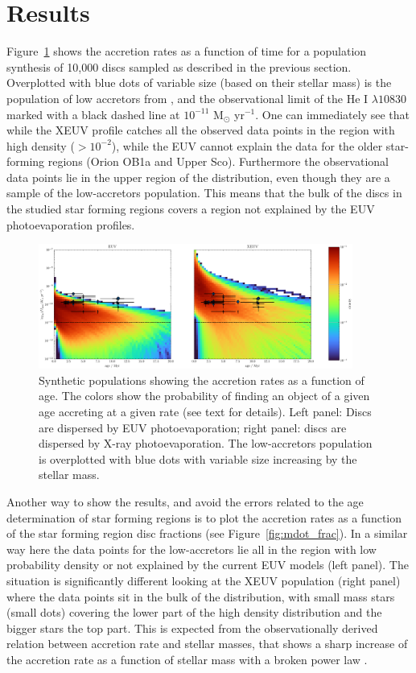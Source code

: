 \documentclass[fleqn,usenatbib,letters]{mnras}
\begin{document}
\section{Results}\label{sec:results}

Figure~\ref{fig:mdot_age} shows the accretion rates as a function of time for a population synthesis of 10,000 discs sampled as described in the previous section.
Overplotted with blue dots of variable size (based on their stellar mass) is the population of low accretors from \citet{Thanathibodee2023}, and the observational limit of the He I $\lambda10830$ marked with a black dashed line at $10^{-11}$ M$_\odot$ yr$^{-1}$.
One can immediately see that while the XEUV profile catches all the observed data points in the region with high density ($> 10^{-2}$), while the EUV cannot explain the data for the older star-forming regions (Orion OB1a and Upper Sco). Furthermore the observational data points lie in the upper region of the distribution, even though they are a sample of the low-accretors population. This means that the bulk of the discs in the studied star forming regions covers a region not explained by the EUV photoevaporation profiles.
\begin{figure}
    \includegraphics[width=0.92\textwidth]{mdot_age_comparison}
    \caption{Synthetic populations showing the accretion rates as a function of age. The colors show the probability of finding an object of a given age accreting at a given rate (see text for details). Left panel: Discs are dispersed by EUV photoevaporation; right panel: discs are dispersed by X-ray photoevaporation. The low-accretors population is overplotted with blue dots with variable size increasing by the stellar mass.
    \label{fig:mdot_age}}
\end{figure}

Another way to show the results, and avoid the errors related to the age determination of star forming regions is to plot the accretion rates as a function of the star forming region disc fractions (see Figure~\ref{fig:mdot_frac}). In a similar way here the data points for the low-accretors lie all in the region with low probability density or not explained by the current EUV models (left panel). The situation is significantly different looking at the XEUV population (right panel) where the data points sit in the bulk of the distribution, with small mass stars (small dots) covering the lower part of the high density distribution and the bigger stars the top part. This is expected from the observationally derived relation between accretion rate and stellar masses, that shows a sharp increase of the accretion rate as a function of stellar mass with a broken power law \citep{Alcala2017}.
\end{document}
